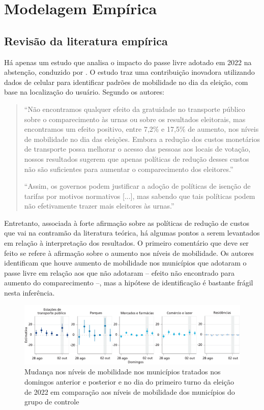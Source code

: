 \section{Modelagem Empírica}
\label{sec_modEmp}

\subsection{Revisão da literatura empírica}
\label{subsec_revisao}

Há apenas um estudo que analisa o impacto do passe livre adotado em 2022 na abstenção, conduzido por \cite{pereira2023transporte}. O estudo traz uma contribuição inovadora utilizando dados de celular para identificar padrões de mobilidade no dia da eleição, com base na localização do usuário. Segundo os autores:

\begin{quote}
    ``Não encontramos qualquer efeito da gratuidade no transporte público sobre
    o comparecimento às urnas ou sobre os resultados eleitorais, mas encontramos um efeito positivo,
    entre 7,2\% e 17,5\% de aumento, nos níveis de mobilidade no dia das eleições. Embora a redução
    dos custos monetários de transporte possa melhorar o acesso das pessoas aos locais de votação,
    nossos resultados sugerem que apenas políticas de redução desses custos não são suficientes
    para aumentar o comparecimento dos eleitores.'' 

    ``Assim, os governos podem justificar a adoção de políticas de isenção de tarifas por motivos normativos [...], mas sabendo que tais políticas podem não efetivamente trazer mais eleitores às urnas.''
\end{quote}

Entretanto, associada à forte afirmação sobre as políticas de redução de custos que vai na contramão da literatura teórica, há algumas pontos a serem levantados em relação à interpretação dos resultados. O primeiro comentário que deve ser feito se refere à afirmação sobre o aumento nos níveis de mobilidade. Os autores identificam que houve aumento de mobilidade nos municípios que adotaram o passe livre em relação aos que não adotaram -- efeito não encontrado para aumento do comparecimento --, mas a hipótese de identificação é bastante frágil nesta inferência. 

\begin{figure}[!ht]
    \includegraphics[width = \linewidth]{relatorios/passe-livre/graficos/pereira_mob.png}
    \caption{Mudança nos níveis de mobilidade nos municípios tratados nos domingos anterior e
posterior e no dia do primeiro turno da eleição de 2022 em comparação aos níveis de
mobilidade dos municípios do grupo de controle}
    \label{fig_pereira_mob}
\end{figure}

